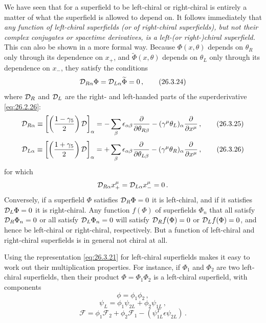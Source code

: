 We have seen that for a superfield to be left-chiral or right-chiral is
entirely a matter of what the superfield is allowed to depend on. It follows
immediately that \emph{any function of left-chiral superfields (or of
right-chiral superfields), but not their complex conjugates or spacetime
derivatives, is a left-(or right-)chiral superfield.} This can also be shown in
a more formal way. Because $\Phi(x,\theta)$ depends on $\theta_R$ only through
its dependence on $x_+$, and $\widetilde{\Phi}(x,\theta)$ depends on $\theta_L$
only through its dependence on $x_-$, they satisfy the conditions
\begin{equation}
  \mathcal{D}_{R\alpha}\Phi
  =\mathcal{D}_{L\alpha}\widetilde{\Phi}=0\,,
  \tag{26.3.24}\label{eq:26.3.24}
\end{equation}
where $\mathcal{D}_R$ and $\mathcal{D}_L$ are the right- and left-handed parts of the
superderivative \eqref{eq:26.2.26}:
\begin{equation}
  \mathcal{D}_{R\alpha}
  \equiv\left[\left(\frac{1-\gamma_5}{2}\right)\mathcal{D}\right]_\alpha
  =-\sum_\beta\epsilon_{\alpha\beta}
    \frac{\partial}{\partial\theta_{R\beta}}
  -(\gamma^\mu\theta_L)_\alpha\frac{\partial}{\partial x^\mu}\,,
  \tag{26.3.25}\label{eq:26.3.25}
\end{equation}
\begin{equation}
  \mathcal{D}_{L\alpha}
  \equiv\left[\left(\frac{1+\gamma_5}{2}\right)\mathcal{D}\right]_\alpha
  =+\sum_\beta\epsilon_{\alpha\beta}
    \frac{\partial}{\partial\theta_{L\beta}}
  -(\gamma^\mu\theta_R)_\alpha\frac{\partial}{\partial x^\mu}\,,
  \tag{26.3.26}\label{eq:26.3.26}
\end{equation}
for which
\[
  \mathcal{D}_{R\alpha}x_+^\mu
  =\mathcal{D}_{L\alpha}x_-^\mu=0\,.
\]
Conversely, if a superfield $\Phi$ satisfies $\mathcal{D}_R\Phi=0$ it is
left-chiral, and if it satisfies $\mathcal{D}_L\Phi=0$ it is right-chiral. Any
function $f(\Phi)$ of superfields $\Phi_n$ that all satisfy
$\mathcal{D}_R\Phi_n=0$ or all satisfy $\mathcal{D}_L\Phi_n=0$ will satisfy
$\mathcal{D}_Rf(\Phi)=0$ or $\mathcal{D}_Lf(\Phi)=0$, and hence be left-chiral or
right-chiral, respectively. But a function of left-chiral and right-chiral
superfields is in general not chiral at all.

Using the representation \eqref{eq:26.3.21} for left-chiral superfields makes
it easy to work out their multiplication properties. For instance, if
$\Phi_1$ and $\Phi_2$ are two left-chiral superfields, then their product
$\Phi=\Phi_1\Phi_2$ is a left-chiral superfield, with components
\begin{equation}
  \phi=\phi_1\phi_2\,,
  \tag{26.3.27}\label{eq:26.3.27}
\end{equation}
\begin{equation}
  \psi_L=\phi_1\psi_{2L}+\phi_2\psi_{1L}\,,
  \tag{26.3.28}\label{eq:26.3.28}
\end{equation}
\begin{equation}
  \mathcal{F}
  =\phi_1\mathcal{F}_2+\phi_2\mathcal{F}_1
  -(\psi_{1L}^T\epsilon\psi_{2L})\,.
  \tag{26.3.29}\label{eq:26.3.29}
\end{equation}

